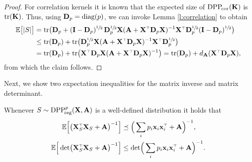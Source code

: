\documentclass[thesis.tex]{subfiles}
\begin{document}
\begin{proof}
For correlation kernels it is known that the expected size of ${{\mathrm{DPP}}_{\!\mathrm{cor}}}(\mathbf K)$
is $\mathrm{tr}(\mathbf K)$. Thus, using $\mathbf D_p=\operatorname*{\mathop{\mathrm{diag}}}(p)$, we can invoke Lemma \ref{l:correlation} to obtain
\begin{align*}
  \E\big[|S|\big]
  &= \tr\big(\D_p +
  (\I-\D_p)^{\sfrac12}\,\D_p^{\sfrac12}\X(\A+\X^\top\D_p\X)^{-1}
                    \X^\top\D_p^{\sfrac12}(\I-\D_p)^{\sfrac12}\big)
  \\ &\leq \tr(\D_p) +\tr\big(\D_p^{\sfrac12}
       \X(\A+\X^\top\D_p\X)^{-1}\X^\top\D_p^{\sfrac12}\big)
\\ &=\tr(\D_p) +\tr\big(\X^\top\D_p\X (\A+\X^\top\D_p\X)^{-1}\big) =
     \tr(\D_p) + d_{\A}(\X^\top\D_p\X),
\end{align*}
from which the claim follows.
\end{proof}
Next, we show two expectation inequalities for the matrix inverse and
matrix determinant.
\begin{lemma}
Whenever $S\sim {{\mathrm{DPP}}_{\!\mathrm{reg}}^{p}}(\mathbf X,\mathbf A)$ is a well-defined distribution it holds that
\begin{align}
  \E\Big[\big(\X_S^\top\X_S+\A\big)^{-1}\Big]
  &\preceq \Big(
    \sum_ip_i\x_i\x_i^\top +\A \Big)^{-1},\label{eq:sqinv2}
  \\
\E\Big[\det\!\big(\X_S^\top\X_S+\A\big)^{-1}\Big]
  &\leq\det\!\Big(
    \sum_ip_i\x_i\x_i^\top +\A \Big)^{-1}.\label{eq:det2}
\end{align}
\end{lemma}
\end{document}
